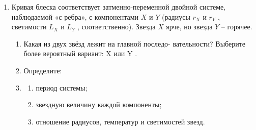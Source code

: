 \documentclass[12pt]{article}
\begin{document}
\begin{enumerate}
    \item Кривая блеска соответствует затменно-переменной двойной системе, наблюдаемой «с ребра», с компонентами $X$ и $Y$ (радиусы $r_X$ и $r_Y$ , светимости $L_X$ и $L_Y$ , соответственно). Звезда $X$ ярче, но звезда $Y$ -- горячее.
    
    \begin{figure}[h!]
	\end{figure}
    
    \begin{enumerate}
        \item Какая из двух звёзд лежит на главной последо- вательности? Выберите более
        вероятный вариант: X или Y .
        \item Определите:
        \item \begin{enumerate}
            \item период системы;
            \item звездную величину каждой компоненты;
            \item отношение радиусов, температур и светимостей звезд.
        \end{enumerate}
    \end{enumerate}
    

\end{enumerate}
\end{document}
